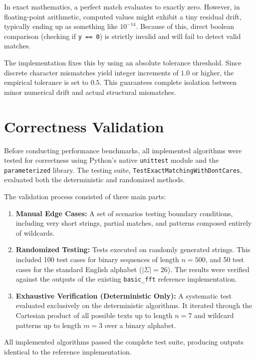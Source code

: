 In exact mathematics, a perfect match evaluates to exactly zero. However, in floating-point arithmetic, computed values might exhibit a tiny residual drift, typically ending up as something like $10^{-14}$. Because of this, direct boolean comparison (checking if \texttt{y == 0}) is strictly invalid and will fail to detect valid matches. 

The implementation fixes this by using an absolute tolerance threshold. Since discrete character mismatches yield integer increments of $1.0$ or higher, the empirical tolerance is set to $0.5$. This guarantees complete isolation between minor numerical drift and actual structural mismatches.

\section{Correctness Validation}
Before conducting performance benchmarks, all implemented algorithms were tested for correctness using Python's native \texttt{unittest} module and the \texttt{parameterized} library. The testing suite, \texttt{TestExactMatchingWithDontCares}, evaluated both the deterministic and randomized methods.

The validation process consisted of three main parts:
\begin{enumerate}
    \item \textbf{Manual Edge Cases:} A set of scenarios testing boundary conditions, including very short strings, partial matches, and patterns composed entirely of wildcards.
    \item \textbf{Randomized Testing:} Tests executed on randomly generated strings. This included 100 test cases for binary sequences of length $n=500$, and 50 test cases for the standard English alphabet ($|\Sigma|=26$). The results were verified against the outputs of the existing \texttt{basic\_fft} reference implementation.
\item \textbf{Exhaustive Verification (Deterministic Only):} A systematic test evaluated exclusively on the deterministic algorithms. It iterated through the Cartesian product of all possible texts up to length $n=7$ and wildcard patterns up to length $m=3$ over a binary alphabet.
\end{enumerate}

All implemented algorithms passed the complete test suite, producing outputs identical to the reference implementation.

